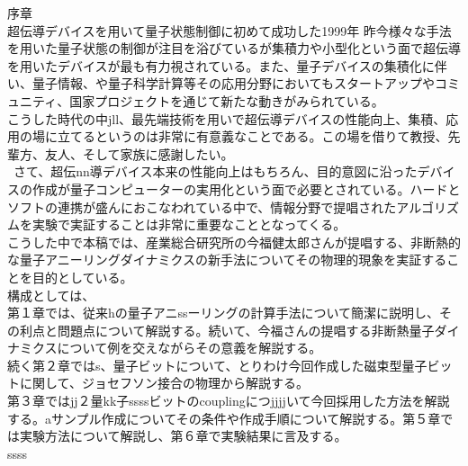 {\Large 序章}\\

超伝導デバイスを用いて量子状態制御に初めて成功した1999年
昨今様々な手法を用いた量子状態の制御が注目を浴びているが集積力や小型化という面で超伝導を用いたデバイスが最も有力視されている。また、量子デバイスの集積化に伴い、量子情報、や量子科学計算等その応用分野においてもスタートアップやコミュニティ、国家プロジェクトを通じて新たな動きがみられている。\\
こうした時代の中jll、最先端技術を用いで超伝導デバイスの性能向上、集積、応用の場に立てるというのは非常に有意義なことである。この場を借りて教授、先輩方、友人、そして家族に感謝したい。\\
\ さて、超伝nn導デバイス本来の性能向上はもちろん、目的意図に沿ったデバイスの作成が量子コンピューターの実用化という面で必要とされている。ハードとソフトの連携が盛んにおこなわれている中で、情報分野で提唱されたアルゴリズムを実験で実証することは非常に重要なこととなってくる。\\
こうした中で本稿では、産業総合研究所の今福健太郎さんが提唱する、非断熱的な量子アニーリングダイナミクスの新手法についてその物理的現象を実証することを目的としている。\\
構成としては、\\
第１章では、従来hの量子アニssーリングの計算手法について簡潔に説明し、その利点と問題点について解説する。続いて、今福さんの提唱する非断熱量子ダイナミクスについて例を交えながらその意義を解説する。\\
続く第２章ではs、量子ビットについて、とりわけ今回作成した磁束型量子ビットに関して、ジョセフソン接合の物理から解説する。\\
第３章ではjj２量kk子ssssビットのcouplingにつjjjjいて今回採用した方法を解説する。aサンプル作成についてその条件や作成手順について解説する。第５章では実験方法について解説し、第６章で実験結果に言及する。\\
ssss\\